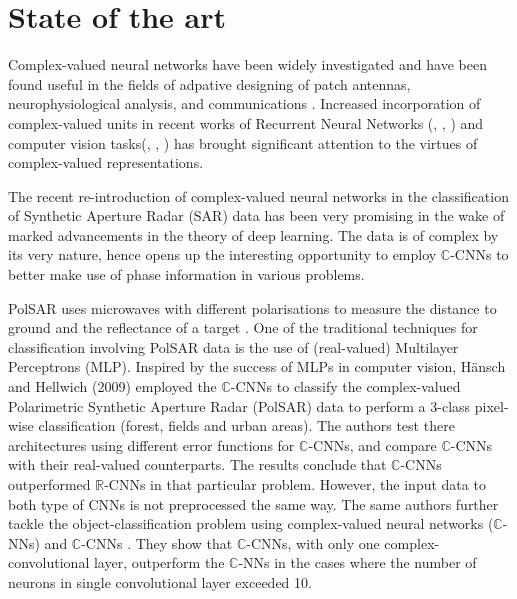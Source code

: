 \chapter{State of the art}\label{chap:comp}

Complex-valued neural networks have been widely investigated and have been found useful in the fields of adpative designing of patch antennas, neurophysiological analysis, and communications \cite{hirose2012complex}. Increased incorporation of complex-valued units in recent works of Recurrent Neural Networks (\cite{ArjovskySB15}, \cite{wisdom2016full}, \cite{danihelka2016associative}) and computer vision tasks(\cite{oyallon2015deep}, \cite{bruna2015theoretical}, \cite{worrall2017harmonic}) has brought significant attention to the virtues of complex-valued representations. 



The recent re-introduction of complex-valued neural networks in the classification of Synthetic Aperture Radar (SAR) data has been very promising in the wake of marked advancements in the theory of deep learning. The data is of complex by its very nature, hence opens up the interesting opportunity to employ $\mathbb{C}$-CNNs to better make use of phase information in various problems.

PolSAR uses microwaves with different polarisations to measure
the distance to ground and the reflectance of a target \cite{hansch2009classification}. One of the traditional techniques for classification involving PolSAR data is the use of (real-valued) Multilayer Perceptrons (MLP). Inspired by the success of MLPs in computer vision, H\"{a}nsch and Hellwich (2009) \cite{hansch2009classification} employed the $\mathbb{C}$-CNNs to classify the complex-valued Polarimetric Synthetic Aperture Radar (PolSAR) data to perform a 3-class pixel-wise classification (forest, fields and urban areas). The authors test there architectures using different error functions for $\mathbb{C}$-CNNs, and compare $\mathbb{C}$-CNNs with their real-valued counterparts. The results conclude that $\mathbb{C}$-CNNs outperformed $\mathbb{R}$-CNNs in that particular problem. However, the input data to both type of CNNs is not preprocessed the same way. The same authors further tackle the object-classification problem using complex-valued neural networks ($\mathbb{C}$-NNs) and $\mathbb{C}$-CNNs \cite{hansch2010complex}. They show that $\mathbb{C}$-CNNs, with only one complex-convolutional layer, outperform the $\mathbb{C}$-NNs in the cases where the number of neurons in single convolutional layer exceeded 10. 

